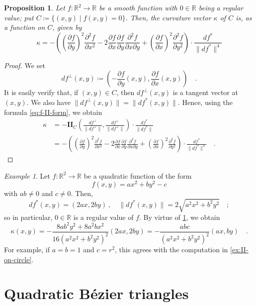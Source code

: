 \documentclass[pdftex,a4paper,12pt]{scrartcl}
\theoremstyle{plain}
\newtheorem{proposition}[theorem]{Proposition}
\theoremstyle{definition}
\theoremstyle{remark}
\newtheorem{example}[theorem]{Example}
\begin{document}
\begin{proposition}
\label{prop:f-curvature}
Let $f:\mathbb R^2\to\mathbb R$ be a smooth function with $0\in\mathbb R$ being a regular value; put $C\coloneqq\{(x,y)\mid f(x,y)=0\}$.
Then, the curvature vector $\kappa$ of $C$ is, as a function on $C$, given by
\[
\kappa
= -\left(
\left(\frac{\partial f}{\partial y}\right)^2\frac{\partial^2 f}{\partial x^2}
-2\frac{\partial f}{\partial x}\frac{\partial f}{\partial y}\frac{\partial^2 f}{\partial x\partial y}
+\left(\frac{\partial f}{\partial x}\right)^2\frac{\partial^2 f}{\partial y^2}
\right)\cdot
\frac{df^\ast}{\|df^\ast\|^4}
\]
\end{proposition}
\begin{proof}
We set
\[
df^\perp(x,y)
\coloneqq \left(-\frac{\partial f}{\partial y}(x,y), \frac{\partial f}{\partial x}(x,y)\right)
\quad.
\]
It is easily verify that, if $(x,y)\in C$, then $df^\perp(x,y)$ is a tangent vector at $(x,y)$.
We also have $\|df^\perp(x,y)\|=\|df^\ast(x,y)\|$.
Hence, using the formula \eqref{eq:f-II-form}, we obtain
\[
\begin{split}
\kappa
&= -\mathbf{II}_C\left(\frac{df^\perp}{\|df^\perp\|},\frac{df^\perp}{\|df^\perp\|}\right)\cdot\frac{df^\ast}{\|df^\ast\|} \\
&= -\left(
\left(\frac{\partial f}{\partial y}\right)^2\frac{\partial^2 f}{\partial x^2}
-2\frac{\partial f}{\partial x}\frac{\partial f}{\partial y}\frac{\partial^2 f}{\partial x\partial y}
+\left(\frac{\partial f}{\partial x}\right)^2\frac{\partial^2 f}{\partial y^2}
\right)\cdot
\frac{df^\ast}{\|df^\ast\|^4}
\quad.
\end{split}
\]
\end{proof}

\begin{example}
Let $f:\mathbb R^2\to\mathbb R$ be a quadratic function of the form
\[
f(x,y)=ax^2+by^2-c
\]
with $ab\neq 0$ and $c\neq 0$.
Then,
\[
df^\ast(x,y) = (2ax, 2by)
\ ,\quad
\|df^\ast(x,y)\| = 2\sqrt{a^2x^2+b^2y^2}
\quad;
\]
so in particular, $0\in\mathbb R$ is a regular value of $f$.
By virtue of \cref{prop:f-curvature}, we obtain
\[
\kappa(x,y)
= -\frac{8ab^2y^2+8a^2bx^2}{16(a^2x^2+b^2y^2)^2}(2ax,2by)
= -\frac{abc}{(a^2x^2+b^2y^2)^2}(ax,by)
\quad.
\]
For example, if $a=b=1$ and $c=r^2$, this agrees with the computation in \cref{ex:II-on-circle}.
\end{example}


\section{Quadratic B\'ezier triangles}
\label{sec:qbezier}
\end{document}
